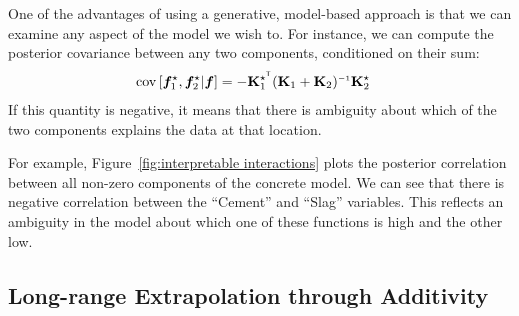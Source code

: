 One of the advantages of using a generative, model-based approach is that we can examine any aspect of the model we wish to.
For instance, we can compute the posterior covariance between any two components, conditioned on their sum:
%
\begin{align}
\covargs{ \vf_1^\star}{\vf_2^\star | \vf } 
& = - \vK_1^{\star\tra} (\vK_1 + \vK_2)\inv \vK_2^\star
\label{eq:post-component-cov}
\end{align}
%
If this quantity is negative, it means that there is ambiguity about which of the two components explains the data at that location.

For example, Figure~\ref{fig:interpretable interactions} plots the posterior correlation between all non-zero components of the concrete model.
We can see that there is negative correlation between the ``Cement'' and ``Slag'' variables.
This reflects an ambiguity in the model about which one of these functions is high and the other low.







\subsection{Long-range Extrapolation through Additivity}
\label{sec:additivity-extrapolation}

